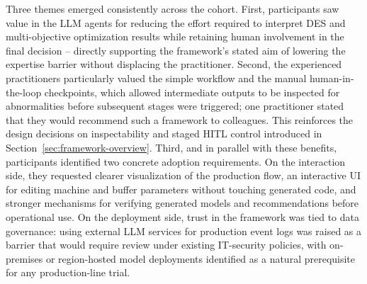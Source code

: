 \documentclass[a4paper,fleqn]{cas-sc}
\begin{document}
  Three themes emerged consistently across the cohort. First, participants                                               
  saw value in the LLM agents for reducing the effort required to
  interpret DES and multi-objective optimization results while retaining                                                 
  human involvement in the final decision -- directly supporting the                                                     
  framework's stated aim of lowering the expertise barrier without                                                       
  displacing the practitioner. Second, the experienced practitioners                                                     
  particularly valued the simple workflow and the manual human-in-the-loop                                               
  checkpoints, which allowed intermediate outputs to be inspected for                                                    
  abnormalities before subsequent stages were triggered; one practitioner                                                
  stated that they would recommend such a framework to colleagues. This                                                  
  reinforces the design decisions on inspectability and staged HITL                                                      
  control introduced in Section~\ref{sec:framework-overview}. Third, and                                                 
  in parallel with these benefits, participants identified two concrete                                                  
  adoption requirements. On the interaction side, they requested clearer                                                 
  visualization of the production flow, an interactive UI for editing                                                    
  machine and buffer parameters without touching generated code, and                                                     
  stronger mechanisms for verifying generated models and recommendations                                                 
  before operational use. On the deployment side, trust in the framework                                                 
  was tied to data governance: using external LLM services for production                                                
  event logs was raised as a barrier that would require review under                                                     
  existing IT-security policies, with on-premises or region-hosted model                                                 
  deployments identified as a natural prerequisite for any production-line                                               
  trial.
\end{document}
